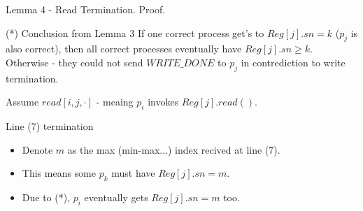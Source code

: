\begin{frame}{Lemma 4 - Read Termination. Proof.}
    \begin{block}{(*) Conclusion from Lemma 3}
        If one correct process get's to $Reg[j].sn=k$ ($p_j$ is also correct),
        then all correct processes eventually have $Reg[j].sn\geq k$.\\
        Otherwise - they could not send $WRITE\_DONE$ to
        $p_j$ in contrediction to write termination.
    \end{block}
    Assume $read[i,j,\cdot]$ - meaing $p_i$ invokes $Reg[j].read()$.
    \begin{block}{Line (7) termination}
        \begin{itemize}
            \item Denote $m$ as the max (min-max...) index recived at line (7).
            \item This means some $p_k$ must have $Reg[j].sn=m$.
            \item Due to (*), $p_i$ eventually gets $Reg[j].sn=m$ too.
        \end{itemize}
    \end{block}
\end{frame}
